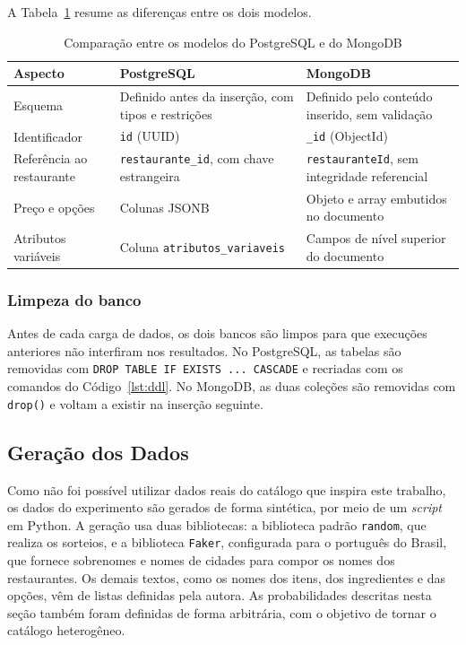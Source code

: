 A Tabela~\ref{tab:comparacao-modelos} resume as diferenças entre os dois modelos.

\begin{table}[H]
    \centering
    \caption{Comparação entre os modelos do PostgreSQL e do MongoDB}
    \label{tab:comparacao-modelos}
    \small
    \begin{tabular}{|>{\raggedright\arraybackslash}p{3.6cm}|>{\raggedright\arraybackslash}p{5.4cm}|>{\raggedright\arraybackslash}p{5.4cm}|}
        \hline
        \textbf{Aspecto} & \textbf{PostgreSQL} & \textbf{MongoDB} \\
        \hline
        Esquema & Definido antes da inserção, com tipos e restrições & Definido pelo conteúdo inserido, sem validação \\ \hline
        Identificador & \texttt{id} (UUID) & \texttt{\_id} (ObjectId) \\ \hline
        Referência ao restaurante & \texttt{restaurante\_id}, com chave estrangeira & \texttt{restauranteId}, sem integridade referencial \\ \hline
        Preço e opções & Colunas JSONB & Objeto e array embutidos no documento \\ \hline
        Atributos variáveis & Coluna \texttt{atributos\_variaveis} & Campos de nível superior do documento \\ \hline
    \end{tabular}
    \vspace{0.4em}
\end{table}

\subsubsection{Limpeza do banco}

Antes de cada carga de dados, os dois bancos são limpos para que execuções anteriores não interfiram nos resultados. No PostgreSQL, as tabelas são removidas com \texttt{DROP TABLE IF EXISTS ... CASCADE} e recriadas com os comandos do Código~\ref{lst:ddl}. No MongoDB, as duas coleções são removidas com \texttt{drop()} e voltam a existir na inserção seguinte. 

\subsection{Geração dos Dados}

Como não foi possível utilizar dados reais do catálogo que inspira este trabalho, os dados do experimento são gerados de forma sintética, por meio de um \textit{script} em Python. A geração usa duas bibliotecas: a biblioteca padrão \texttt{random}, que realiza os sorteios, e a biblioteca \texttt{Faker}, configurada para o português do Brasil, que fornece sobrenomes e nomes de cidades para compor os nomes dos restaurantes. Os demais textos, como os nomes dos itens, dos ingredientes e das opções, vêm de listas definidas pela autora. As probabilidades descritas nesta seção também foram definidas de forma arbitrária, com o objetivo de tornar o catálogo heterogêneo.

